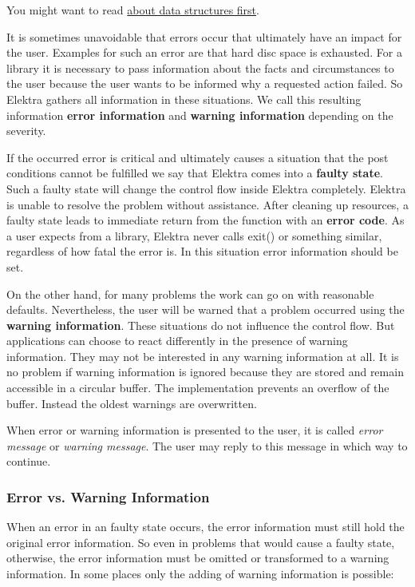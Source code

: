 You might want to read \hyperlink{md_doc_help_elektra-data-structures_doc_help_elektra-data-structures_md}{about data structures first}.

It is sometimes unavoidable that errors occur that ultimately have an impact for the user. Examples for such an error are that hard disc space is exhausted. For a library it is necessary to pass information about the facts and circumstances to the user because the user wants to be informed why a requested action failed. So Elektra gathers all information in these situations. We call this resulting information {\bfseries error information} and {\bfseries warning information} depending on the severity.

If the occurred error is critical and ultimately causes a situation that the post conditions cannot be fulfilled we say that Elektra comes into a {\bfseries faulty state}. Such a faulty state will change the control flow inside Elektra completely. Elektra is unable to resolve the problem without assistance. After cleaning up resources, a faulty state leads to immediate return from the function with an {\bfseries error code}. As a user expects from a library, Elektra never calls {\ttfamily exit()} or something similar, regardless of how fatal the error is. In this situation error information should be set.

On the other hand, for many problems the work can go on with reasonable defaults. Nevertheless, the user will be warned that a problem occurred using the {\bfseries warning information}. These situations do not influence the control flow. But applications can choose to react differently in the presence of warning information. They may not be interested in any warning information at all. It is no problem if warning information is ignored because they are stored and remain accessible in a circular buffer. The implementation prevents an overflow of the buffer. Instead the oldest warnings are overwritten.

When error or warning information is presented to the user, it is called {\itshape error message} or {\itshape warning message}. The user may reply to this message in which way to continue.

\subsubsection*{Error vs. Warning Information}

When an error in an faulty state occurs, the error information must still hold the original error information. So even in problems that would cause a faulty state, otherwise, the error information must be omitted or transformed to a warning information. In some places only the adding of warning information is possible\+:


